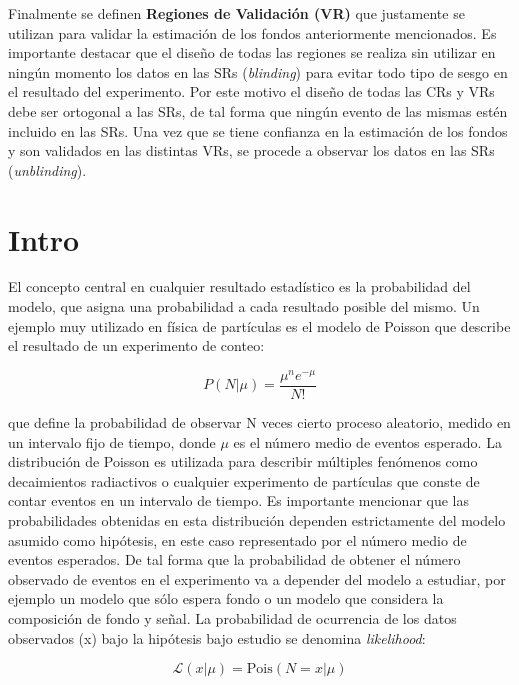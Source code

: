 Finalmente se definen \textbf{Regiones de Validación (VR)} que justamente se utilizan para validar la estimación de los fondos anteriormente mencionados. Es importante destacar que el diseño de todas las regiones se realiza sin utilizar en ningún momento los datos en las SRs (\textit{blinding}) para evitar todo tipo de sesgo en el resultado del experimento. Por este motivo el diseño de todas las CRs y VRs debe ser ortogonal a las SRs, de tal forma que ningún evento de las mismas estén incluido en las SRs. Una vez que se tiene confianza en la estimación de los fondos y son validados en las distintas VRs, se procede a observar los datos en las SRs (\textit{unblinding}).

\section{Intro}

El concepto central en cualquier resultado estadístico es la probabilidad del modelo, que asigna una probabilidad a cada resultado posible del mismo. Un ejemplo muy utilizado en física de partículas es el modelo de Poisson que describe el resultado de un experimento de conteo:

\begin{equation}
	P(N|\mu) = \frac{\mu^{n}e^{-\mu}}{N!}
\end{equation}

que define la probabilidad de observar N veces cierto proceso aleatorio, medido en un intervalo fijo de tiempo, donde $\mu$ es el número medio de eventos esperado. La distribución de Poisson es utilizada para describir múltiples fenómenos como decaimientos radiactivos o cualquier experimento de partículas que conste de contar eventos en un intervalo de tiempo. Es importante mencionar que las probabilidades obtenidas en esta distribución dependen estrictamente del modelo asumido como hipótesis, en este caso representado por el número medio de eventos esperados. De tal forma que la probabilidad de obtener el número observado de eventos en el experimento va a depender del modelo a estudiar, por ejemplo un modelo que sólo espera fondo o un modelo que considera la composición de fondo y señal. La probabilidad de ocurrencia de los datos observados (x) bajo la hipótesis bajo estudio se denomina \textit{likelihood}:

\begin{equation}
	\mathcal{L}(x|\mu) = \text{Pois}(N=x|\mu) 
\end{equation}

